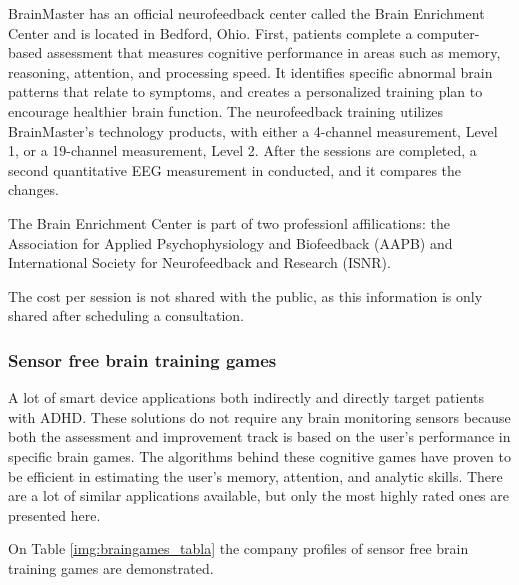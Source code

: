 \documentclass[letterpaper,10pt]{article}
\begin{document}
\cite{brainmasterscom}

BrainMaster has an official neurofeedback center called the Brain Enrichment Center and is located in Bedford, Ohio. First, patients complete a computer-based assessment that measures cognitive performance in areas such as memory, reasoning, attention, and processing speed. It identifies specific abnormal brain patterns that relate to symptoms, and creates a personalized training plan to encourage healthier brain function. 
The neurofeedback training utilizes BrainMaster’s technology products, with either a 4-channel measurement, Level 1, or a 19-channel measurement, Level 2. After the sessions are completed, a second quantitative EEG measurement in conducted, and it compares the changes. 

\cite{bmlocation}

The Brain Enrichment Center is part of two professionl affilications: the Association for Applied Psychophysiology and Biofeedback (AAPB) and International Society for Neurofeedback and Research (ISNR).

The cost per session is not shared with the public, as this information is only shared after scheduling a consultation. 

\subsubsection{Sensor free brain training games}



A lot of smart device applications both indirectly and directly target patients with ADHD. These solutions do not require any brain monitoring sensors because both the assessment and improvement track is based on the user’s performance in specific brain games. The algorithms behind these cognitive games have proven to be efficient in estimating the user’s memory, attention, and analytic skills. There are a lot of similar applications available, but only the most highly rated ones are presented here.

On Table \ref{img:braingames_tabla} the company profiles of sensor free brain training games are demonstrated. 
\end{document}
